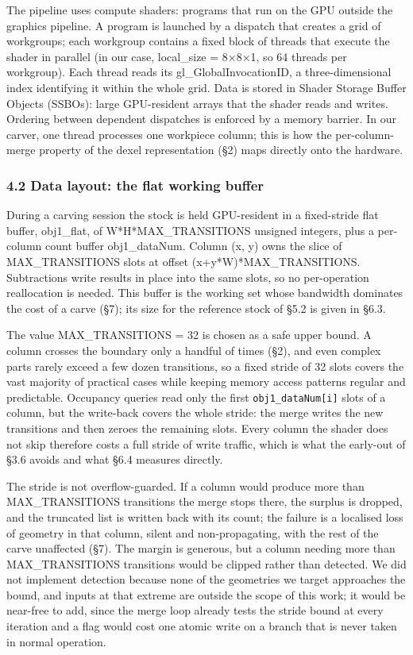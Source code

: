 \documentclass[
]{article}
\begin{document}
The pipeline uses compute shaders: programs that run on the GPU outside
the graphics pipeline. A program is launched by a dispatch that creates
a grid of workgroups; each workgroup contains a fixed block of threads
that execute the shader in parallel (in our case, local\_size = 8×8×1,
so 64 threads per workgroup). Each thread reads its
gl\_\allowbreak GlobalInvocationID, a three-dimensional index identifying it within
the whole grid. Data is stored in Shader Storage Buffer Objects (SSBOs):
large GPU-resident arrays that the shader reads and writes. Ordering
between dependent dispatches is enforced by a memory barrier. In our
carver, one thread processes one workpiece column; this is how the
per-column-merge property of the dexel representation (§2) maps directly
onto the hardware.

\hypertarget{data-layout-the-flat-working-buffer}{%
\subsubsection{4.2 Data layout: the flat working
buffer}\label{data-layout-the-flat-working-buffer}}

During a carving session the stock is held GPU-resident in a
fixed-stride flat buffer, obj1\_flat, of W*H*MAX\_TRANSITIONS unsigned
integers, plus a per-column count buffer obj1\_dataNum. Column (x, y)
owns the slice of MAX\_TRANSITIONS slots at offset
(x+y*W)*MAX\_TRANSITIONS. Subtractions write results in place into the
same slots, so no per-operation reallocation is needed. This buffer is
the working set whose bandwidth dominates the cost of a carve (§7); its
size for the reference stock of §5.2 is given in §6.3.

The value MAX\_TRANSITIONS = 32 is chosen as a safe upper bound. A
column crosses the boundary only a handful of times (§2), and even
complex parts rarely exceed a few dozen transitions, so a fixed stride
of 32 slots covers the vast majority of practical cases while keeping
memory access patterns regular and predictable. Occupancy queries read
only the first \texttt{obj1\_dataNum{[}i{]}} slots of a column, but the
write-back covers the whole stride: the merge writes the new transitions
and then zeroes the remaining slots. Every column the shader does not
skip therefore costs a full stride of write traffic, which is what the
early-out of §3.6 avoids and what §6.4 measures directly.

The stride is not overflow-guarded. If a column would produce more than
MAX\_TRANSITIONS transitions the merge stops there, the surplus is
dropped, and the truncated list is written back with its count; the
failure is a localised loss of geometry in that column, silent and
non-propagating, with the rest of the carve unaffected (§7). The margin
is generous, but a column needing more than MAX\_TRANSITIONS transitions
would be clipped rather than detected. We did not implement detection
because none of the geometries we target approaches the bound, and
inputs at that extreme are outside the scope of this work; it would be
near-free to add, since the merge loop already tests the stride bound at
every iteration and a flag would cost one atomic write on a branch that
is never taken in normal operation.
\end{document}
